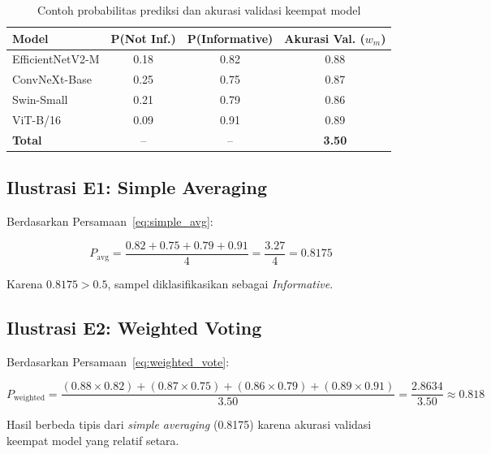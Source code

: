 \begin{table}[h]
    \centering
    \caption{Contoh probabilitas prediksi dan akurasi validasi keempat
    model}
    \label{table:ilustrasi_input}
    \begin{tabular}{|l|c|c|c|}
        \hline
        \textbf{Model} &
        \textbf{P(Not Inf.)} &
        \textbf{P(Informative)} &
        \textbf{Akurasi Val. ($w_m$)} \\
        \hline
        EfficientNetV2-M & 0.18 & 0.82 & 0.88 \\
        ConvNeXt-Base    & 0.25 & 0.75 & 0.87 \\
        Swin-Small       & 0.21 & 0.79 & 0.86 \\
        ViT-B/16         & 0.09 & 0.91 & 0.89 \\
        \hline
        \textbf{Total}   & --   & --   & \textbf{3.50} \\
        \hline
    \end{tabular}
\end{table}

\subsection{Ilustrasi E1: Simple Averaging}
Berdasarkan Persamaan~\ref{eq:simple_avg}:

\begin{equation}
    P_{\text{avg}} = \frac{0.82 + 0.75 + 0.79 + 0.91}{4}
    = \frac{3.27}{4} = 0.8175
\end{equation}

Karena $0.8175 > 0.5$, sampel diklasifikasikan sebagai
\textit{Informative}. \par

\subsection{Ilustrasi E2: Weighted Voting}
Berdasarkan Persamaan~\ref{eq:weighted_vote}:

\begin{equation}
    P_{\text{weighted}} =
    \frac{(0.88 \times 0.82) + (0.87 \times 0.75)
    + (0.86 \times 0.79) + (0.89 \times 0.91)}
    {3.50}
    = \frac{2.8634}{3.50} \approx 0.818
\end{equation}

Hasil berbeda tipis dari \textit{simple averaging} (0.8175) karena
akurasi validasi keempat model yang relatif setara. \par

